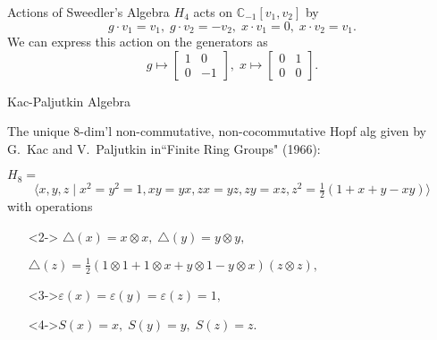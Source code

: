 \documentclass{beamer}
\begin{document}
\begin{frame}{Actions of Sweedler's Algebra}
    $H_4$ acts on $\mathbb{C}_{-1}[v_1,v_2]$ by 
    \[
      g\cdot v_1=v_1,\; g\cdot v_2=-v_2,\; x\cdot v_1=0,\; x\cdot v_2=v_1.  
    \]
    \pause
   We can express this action on the generators as
    \[
    g\mapsto \begin{bmatrix}1&0\\0&-1\end{bmatrix},\; x\mapsto\begin{bmatrix}0&1\\0&0\end{bmatrix}.    
    \]
\end{frame}


\begin{frame}{Kac-Paljutkin Algebra}


 The unique $8$-dim'l non-commutative, non-cocommutative Hopf alg given by G.\ Kac and V.\ Paljutkin in``Finite Ring Groups" (1966):\newline

    $H_8=$
    \[\Big\langle x,y,z\;\vert\; x^2=y^2=1,xy=yx,zx=yz,zy=xz,z^2=\tfrac{1}{2}(1+x+y-xy)\Big\rangle\]
    with operations
    \vspace{2ex}
    \begin{itemize}
    \setlength{\itemsep}{2ex}
    \item[]<2->
    $\triangle(x)=x\otimes x,\; \triangle(y)=y\otimes y,\;$ 
    
    \vspace{2ex}
    
    $\triangle(z)=\tfrac{1}{2}(1\otimes 1+1\otimes x+y\otimes 1-y\otimes x)(z\otimes z),\;$
    
    \item[]<3->$
    \varepsilon(x)=\varepsilon(y)=\varepsilon(z)=1,$

    \item[]<4->$ S(x)=x,\;S(y)=y,\;S(z)=z.$ 
    \end{itemize}
\end{frame}
\end{document}

